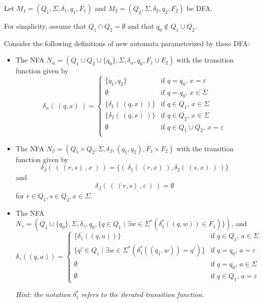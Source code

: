 \documentclass[12pt, oneside]{article}
\begin{document}
\begin{enumerate}[wide, labelwidth=!, labelindent=0pt]
Let $M_1 = (Q_1, \Sigma, \delta_1, q_1, F_1)$ and 
$M_2 = (Q_2, \Sigma, \delta_2, q_2, F_2)$ be DFA.

For simplicity, assume that $Q_1 \cap Q_2 = \emptyset$ and that 
$q_0 \notin Q_1 \cup Q_2$.

Consider the following definitions of new automata parameterized by 
these DFA:
\begin{itemize}
\item The NFA $N_\alpha = ( Q_1 \cup Q_2 \cup \{q_0\}, \Sigma, \delta_\alpha, q_0, F_1 \cup F_2)$ with the transition function given by 
\[
\delta_\alpha ( ~(q,x)~) = \begin{cases}
\{q_1, q_2\} &\text{if $q = q_0$, $x = \varepsilon$} \\
\emptyset &\text{if $q=q_0$, $x\in \Sigma$}\\
\{\delta_{1}(~(q,x)~)\} &\text{if $q\in Q_1$, $x\in \Sigma$}\\
\{\delta_{2}(~(q,x)~)\} &\text{if $q\in Q_2$, $x\in \Sigma$}\\
\emptyset &\text{if $q \in Q_1 \cup Q_2$, $x = \varepsilon$} \\
\end{cases}
\]
\item The NFA $N_\beta = ( Q_1 \times Q_2, \Sigma, \delta_\beta, (q_1,q_2), F_1 \times F_2)$  with the transition function given by 
\[
\delta_\beta(~(~(r,s)~, x~)~) = \{ (~\delta_{1}(~(r,x)~), \delta_{2}( ~(s,x)~)~)\}
\]
 and 
\[
\delta_\beta(~(~(r,s)~, \varepsilon~)~) = \emptyset
\]
for $r \in Q_1, s \in Q_2, x \in \Sigma$.
\item The NFA $N_{\gamma}=(Q_1\cup\{q_{0}\},\Sigma,\delta_{\gamma},q_{0},\{q \in Q_1 \mid \exists w \in \Sigma^* (\delta_1^* ((q,w)) \in F_1)\})$, and
        \[
            \delta_{\gamma} ((q,a)) = \begin{cases}
                \{\delta_1((q,a))\} &\text{if $q \in Q_1$, $a \in \Sigma$} \\
                \{q' \in Q_1 \mid \exists w \in \Sigma^* (\delta_1^*((q_1,w)) = q') \}&\text{if $q =q_{0}$, $a = \varepsilon$}\\
                \emptyset &\text{if $q = q_{0}$, $a \in \Sigma$} \\
                \emptyset &\text{if $q \in Q_1$, $a = \varepsilon$}
            \end{cases}
        \]

{\it Hint: the notation $\delta_1^*$ refers to the iterated transition function.}
\end{itemize}




\end{enumerate}
\end{document}
